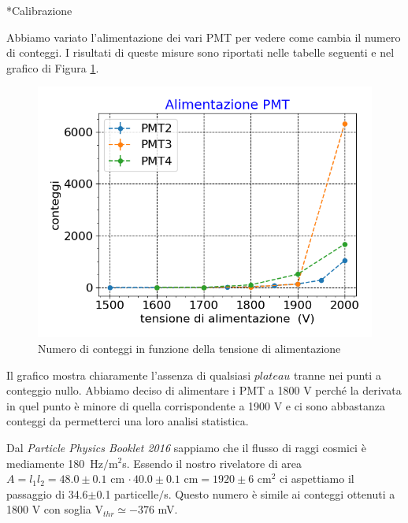 \documentclass[12pt, a4paper]{article}
\author{ Marasciulli Andrea \qquad  Lorenzetti Giacomo \qquad Browne Roberto}
\date{\today}
\begin{document}
\begin{section}*{Calibrazione}

Abbiamo variato l'alimentazione dei vari PMT per vedere come cambia il numero di conteggi. I risultati di queste misure sono  riportati nelle tabelle seguenti e nel grafico di Figura \ref{tensio}. 

\begin{figure}[h]
\centering
\includegraphics[width=10 cm]{tensio_pmt}
\caption{Numero di conteggi in funzione della tensione di alimentazione}
\label{tensio}
\end{figure}

Il grafico mostra chiaramente l'assenza di qualsiasi $plateau$ tranne nei punti a conteggio nullo. Abbiamo deciso di alimentare i PMT a 1800\! V perché la derivata in quel punto è minore di quella corrispondente a 1900\! V e ci sono abbastanza conteggi da permetterci una loro analisi statistica.

Dal \emph{Particle Physics Booklet 2016} sappiamo che il flusso di raggi cosmici è mediamente 180~Hz$/$\!m$^2$s. Essendo il nostro rivelatore di area $A=l_1l_2=48.0\pm0.1$\! cm $\cdot \, 40.0\pm0.1$\! cm$=1920\pm6$\! cm$^2$ ci aspettiamo il passaggio di 34.6$\pm$0.1 particelle$/$s. Questo numero è simile ai conteggi ottenuti a 1800\! V con soglia V$_{thr}\simeq-376$\! mV. 

\end{section}
\end{document}
